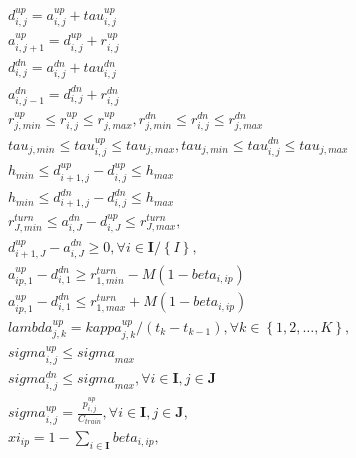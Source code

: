 \begin{align}
  & d_{i , j}^{up} = a_{i , j}^{up} + \mathit{tau}_{i , j}^{up} \tag{eq\_0001\_a} \\
  & a_{i , j + 1}^{up} = d_{i , j}^{up} + r_{i , j}^{up} \tag{eq\_0001\_b} \\
  & d_{i , j}^{dn} = a_{i , j}^{dn} + \mathit{tau}_{i , j}^{dn} \tag{eq\_0002\_a} \\
  & a_{i , j - 1}^{dn} = d_{i , j}^{dn} + r_{i , j}^{dn} \tag{eq\_0002\_b} \\
  & r_{j , min}^{up} \leq r_{i , j}^{up} \leq r_{j , max}^{up} , r_{j , min}^{dn} \leq r_{i , j}^{dn} \leq r_{j , max}^{dn} \tag{eq\_0003\_a} \\
  & \mathit{tau}_{j , min} \leq \mathit{tau}_{i , j}^{up} \leq \mathit{tau}_{j , max} , \mathit{tau}_{j , min} \leq \mathit{tau}_{i , j}^{dn} \leq \mathit{tau}_{j , max} \tag{eq\_0003\_b} \\
  & h_{min} \leq d_{i + 1 , j}^{up} - d_{i , j}^{up} \leq h_{max} \tag{eq\_0004\_a} \\
  & h_{min} \leq d_{i + 1 , j}^{dn} - d_{i , j}^{dn} \leq h_{max} \tag{eq\_0004\_b} \\
  & r_{J , min}^{turn} \leq a_{i , J}^{dn} - d_{i , J}^{up} \leq r_{J , max}^{turn} , \tag{eq\_0005} \\
  & d_{i + 1 , J}^{up} - a_{i , J}^{dn} \geq 0 , \forall i \in \mathbf{I} / \left\{I\right\} , \tag{eq\_0006} \\
  & a_{ip , 1}^{up} - d_{i , 1}^{dn} \geq r_{1 , min}^{turn} - M \left(1 - \mathit{beta}_{i , ip}\right) \tag{eq\_0007\_a} \\
  & a_{ip , 1}^{up} - d_{i , 1}^{dn} \leq r_{1 , max}^{turn} + M \left(1 - \mathit{beta}_{i , ip}\right) \tag{eq\_0007\_b} \\
  & \mathit{lambda}_{j , k}^{up} = \mathit{kappa}_{j , k}^{up} / \left(t_{k} - t_{k - 1}\right) , \forall k \in \left\{1 , 2 , \hdots , K\right\} , \tag{eq\_0009} \\
  & \mathit{sigma}_{i , j}^{up} \leq \mathit{sigma}_{max} \tag{eq\_0010\_a} \\
  & \mathit{sigma}_{i , j}^{dn} \leq \mathit{sigma}_{max} , \forall i \in \mathbf{I} , j \in \mathbf{J} \tag{eq\_0010\_b} \\
  & \mathit{sigma}_{i , j}^{up} = \frac{p_{i , j}^{up}}{C_{train}} , \forall i \in \mathbf{I} , j \in \mathbf{J} , \tag{eq\_0011} \\
  & \mathit{xi}_{ip} = 1 - \sum_{i \in \mathbf{I}} \mathit{beta}_{i , ip} , \tag{eq\_0014} \\

\end{align}
